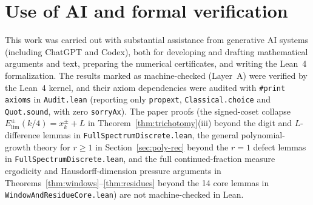 \documentclass[11pt]{article}
\theoremstyle{definition}
\theoremstyle{remark}
\begin{document}
\section*{Use of AI and formal verification}
This work was carried out with substantial assistance from generative AI
systems (including ChatGPT and Codex), both for developing and drafting
mathematical arguments and text, preparing the numerical certificates, and
writing the Lean~4 formalization. The results marked as machine-checked (Layer~A)
were verified by the Lean~4 kernel, and their axiom dependencies were audited
with \texttt{\#print axioms} in \texttt{Audit.lean} (reporting only
\texttt{propext}, \texttt{Classical.choice} and \texttt{Quot.sound}, with zero
\texttt{sorryAx}). The paper proofs (the signed-coset collapse
$E_{\mathrm{lim}}^\pm(k/4)=x_k^\pm+L$ in Theorem~\ref{thm:trichotomy}(iii)
beyond the digit and $L$-difference lemmas in
\texttt{FullSpectrumDiscrete.lean}, the general polynomial-growth theory for
$r\ge1$ in Section~\ref{sec:poly-rec} beyond the $r=1$ defect lemmas in
\texttt{FullSpectrumDiscrete.lean}, and the full continued-fraction measure
ergodicity and Hausdorff-dimension pressure arguments in
Theorems~\ref{thm:windows}--\ref{thm:residues} beyond the 14 core lemmas in
\texttt{WindowAndResidueCore.lean}) are not machine-checked in Lean.
\end{document}
